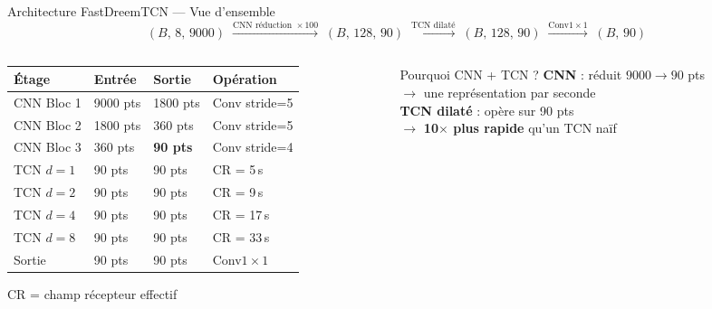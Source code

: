 \documentclass[aspectratio=169, 10pt]{beamer}
\begin{document}
\begin{frame}{Architecture FastDreemTCN — Vue d'ensemble}
    \small
    \[
        (B,\,8,\,9000)
        \;\xrightarrow{\text{CNN réduction }\times 100}\;
        (B,\,128,\,90)
        \;\xrightarrow{\text{TCN dilaté}}\;
        (B,\,128,\,90)
        \;\xrightarrow{\text{Conv}1\times1}\;
        (B,\,90)
    \]

    \vspace{0.15cm}
    \begin{columns}[T]
        \begin{column}{0.50\textwidth}
            \small
            \begin{tabular}{@{}llll@{}}
                \toprule
                \textbf{Étage} & \textbf{Entrée} & \textbf{Sortie} & \textbf{Opération} \\
                \midrule
                CNN Bloc 1 & 9000 pts & 1800 pts & Conv stride=5 \\
                CNN Bloc 2 & 1800 pts & 360 pts  & Conv stride=5 \\
                CNN Bloc 3 & 360 pts  & \textbf{90 pts}   & Conv stride=4 \\
                \midrule
                TCN $d=1$  & 90 pts & 90 pts & CR = 5\,s \\
                TCN $d=2$  & 90 pts & 90 pts & CR = 9\,s \\
                TCN $d=4$  & 90 pts & 90 pts & CR = 17\,s \\
                TCN $d=8$  & 90 pts & 90 pts & CR = 33\,s \\
                \midrule
                Sortie & 90 pts & 90 pts & Conv$1\times1$ \\
                \bottomrule
            \end{tabular}
            \vspace{0.1cm}
            \textcolor{MidGray}{\small CR = champ récepteur effectif}
        \end{column}
        \begin{column}{0.46\textwidth}
            \begin{block}{\small Pourquoi CNN + TCN ?}
                \small
                \textbf{CNN} : réduit $9000 \to 90$ pts\\
                $\to$ une représentation par seconde\\[4pt]
                \textbf{TCN dilaté} : opère sur 90 pts\\
                $\to$ \textbf{10$\times$ plus rapide} qu'un TCN naïf\\[4pt]

\end{block}
\end{column}
\end{columns}
\end{frame}
\end{document}
